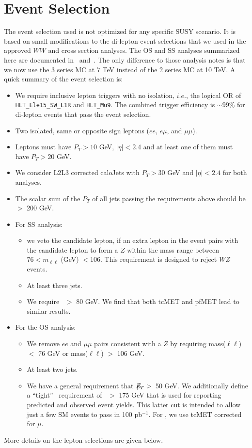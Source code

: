 \section{Event Selection}
\label{sec:eventselection}

The event selection used is not optimized for any specific SUSY
scenario. It is based on small modifications to the di-lepton event
selections  that we used in the approved $WW$\cite{ww} and
\ttbar\cite{ttbar} cross section analyses.  The OS and SS analyses
summarized here are documented in~\cite{osnote} and~\cite{ssnote}. The
only difference to those analysis notes is that we now use the 3
series MC at 7 TeV instead of the 2 series MC at 10 TeV.  
A quick summary of the event selection is:

\begin{itemize}
\item We require inclusive lepton triggers with no isolation, $i.e.$, the
  logical OR of {\tt HLT\_Ele15\_SW\_L1R} and {\tt HLT\_Mu9}. 
  The combined trigger efficiency is $\sim 99$\% for di-lepton events that pass the event selection.
\item Two isolated, same or opposite sign leptons ($ee$, $e\mu$, and $\mu\mu$). 
\item Leptons must have $P_T > 10$ GeV, $|\eta|< 2.4$ and at least one of them must have $P_T > 20$ GeV.
\item We consider L2L3 corrected caloJets with $P_T > 30$ GeV and
	$|\eta|< 2.4$ for both analyses. 
\item The scalar sum of the $P_T$ of all jets passing the requirements above should be $>$ 200 GeV.
\item For SS analysis:
\begin{itemize}
      \item  we veto the candidate lepton, if an extra lepton in the event pairs with the candidate lepton
             to form a $Z$ within the mass range between $76 < m_{\ell\ell} $ (GeV) $< 106$. This requirement is 
             designed to reject $WZ$ events.
      \item At least three jets.
      \item We require \met~$>$ 80 GeV. We find that both tcMET and pfMET lead to similar results.
\end{itemize}
\item For the OS analysis: 
\begin{itemize}
      \item We remove $ee$ and $\mu\mu$ pairs consistent with a $Z$ by requiring mass($\ell\ell$) $<$ 76 GeV or mass($\ell\ell$) $>$ 106 GeV.
      \item At least two jets.
      \item We have a general requirement that $E\!\!\!\!/_T>$~50 GeV. We additionally define a ``tight'' \met~requirement of \met~$>$ 175 GeV
	that is used for reporting predicted and observed event yields.
	This latter cut is intended to allow just a few SM events to
	pass in 100 pb$^{-1}$.  For \met, we use tcMET \cite{tcmet}
	corrected for $\mu$.
\end{itemize}
\end{itemize}
\noindent More details on the lepton %
selections are given below.

